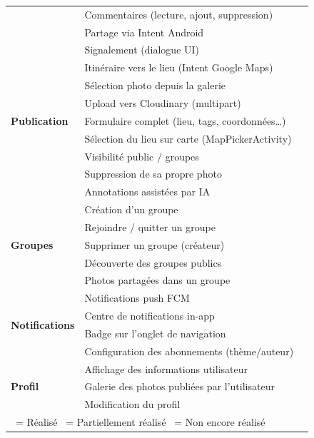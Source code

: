 \documentclass[12pt, a4paper, openany]{report}
\newcommand{\cmark}{\textcolor{success}{\ding{51}}}
\newcommand{\xmark}{\textcolor{danger}{\ding{55}}}
\newcommand{\pmark}{\textcolor{warning}{\ding{119}}}
\begin{document}
\begin{table}[H]
\begin{tabularx}{\textwidth}{lXc}
  & Commentaires (lecture, ajout, suppression)       & \cmark \\
  & Partage via Intent Android                       & \cmark \\
  & Signalement (dialogue UI)                        & \pmark \\
  & Itinéraire vers le lieu (Intent Google Maps)     & \cmark \\
\midrule
\multirow{5}{*}{\textbf{Publication}}
  & Sélection photo depuis la galerie                & \cmark \\
  & Upload vers Cloudinary (multipart)               & \cmark \\
  & Formulaire complet (lieu, tags, coordonnées…)    & \cmark \\
  & Sélection du lieu sur carte (MapPickerActivity)  & \cmark \\
  & Visibilité public / groupes                      & \cmark \\
  & Suppression de sa propre photo                   & \cmark \\
  & Annotations assistées par IA                     & \xmark \\
\midrule
\multirow{5}{*}{\textbf{Groupes}}
  & Création d'un groupe                             & \cmark \\
  & Rejoindre / quitter un groupe                    & \cmark \\
  & Supprimer un groupe (créateur)                   & \cmark \\
  & Découverte des groupes publics                   & \cmark \\
  & Photos partagées dans un groupe                  & \cmark \\
\midrule
\multirow{4}{*}{\textbf{Notifications}}
  & Notifications push FCM                           & \cmark \\
  & Centre de notifications in-app                   & \cmark \\
  & Badge sur l'onglet de navigation                 & \cmark \\
  & Configuration des abonnements (thème/auteur)     & \xmark \\
\midrule
\multirow{3}{*}{\textbf{Profil}}
  & Affichage des informations utilisateur           & \cmark \\
  & Galerie des photos publiées par l'utilisateur    & \xmark \\
  & Modification du profil                           & \xmark \\
\bottomrule
\multicolumn{3}{l}{\footnotesize \cmark~= Réalisé \quad \pmark~= Partiellement réalisé \quad \xmark~= Non encore réalisé}
\end{tabularx}
\end{table}
\end{document}
